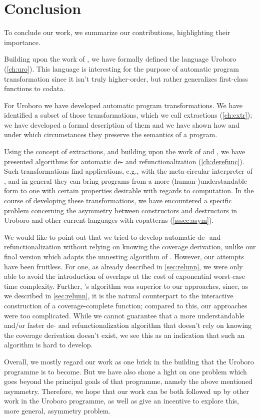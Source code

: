 \chapter{Conclusion}
\label{ch:concl}

To conclude our work, we summarize our contributions, highlighting their importance.

Building upon the work of \citet{rendel15automatic}, we have formally defined the language Uroboro (\autoref{ch:uro}). This language is interesting for the purpose of automatic program transformation since it isn't truly higher-order, but rather generalizes first-class functions to codata.

For Uroboro we have developed automatic program transformations. We have identified a subset of those transformations, which we call extractions (\autoref{ch:extr}); we have developed a formal description of them and we have shown how and under which circumstances they preserve the semantics of a program.

Using the concept of extractions, and building upon the work of \citet{rendel15automatic} and \citet{setzer14unnesting}, we have presented algorithms for automatic de- and refunctionalization (\autoref{ch:derefunc}). Such transformations find applications, e.g., with the meta-circular interpreter of \citet{reynolds72definitional}, and in general they can bring programs from a more (human-)understandable form to one with certain properties desirable with regards to computation. In the course of developing these transformations, we have encountered a specific problem concerning the asymmetry between constructors and destructors in Uroboro and other current languages with copatterns (\autoref{sssec:asym}).

We would like to point out that we tried to develop automatic de- and refunctionalization without relying on knowing the coverage derivation, unlike our final version which adapts the unnesting algorithm of \citet{setzer14unnesting}. However, our attempts have been fruitless. For one, as already described in \autoref{sec:relunn}, we were only able to avoid the introduction of overlaps at the cost of exponential worst-case time complexity. Further, \citeauthor{setzer14unnesting}'s algorithm was superior to our approaches, since, as we described in \autoref{sec:relunn}, it is the natural counterpart to the interactive construction of a coverage-complete function; compared to this, our approaches were too complicated. While we cannot guarantee that a more understandable and/or faster de- and refunctionalization algorithm that doesn't rely on knowing the coverage derivation doesn't exist, we see this as an indication that such an algorithm is hard to develop.

Overall, we mostly regard our work as one brick in the building that the Uroboro programme is to become. But we have also shone a light on one problem which goes beyond the principal goals of that programme, namely the above mentioned asymmetry. Therefore, we hope that our work can be both followed up by other work in the Uroboro programme, as well as give an incentive to explore this, more general, asymmetry problem.